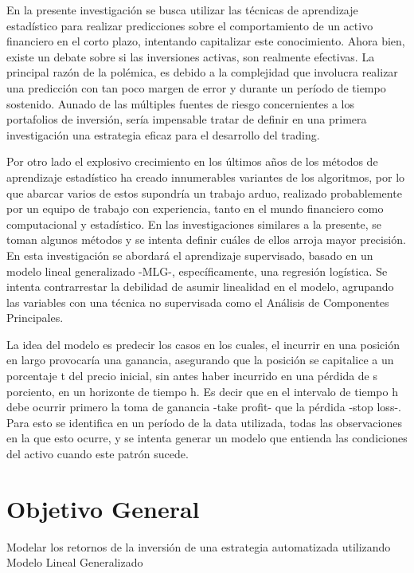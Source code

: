 \documentclass[a4paper,12pt]{Latex/Classes/PhDthesisPSnPDF}
\begin{document}
En la presente investigación se busca utilizar las técnicas de aprendizaje estadístico para realizar predicciones sobre el comportamiento de un activo financiero en el corto  plazo, intentando capitalizar este conocimiento. Ahora bien, existe un debate sobre si las inversiones activas, son realmente efectivas. La principal razón de la polémica, es debido a la complejidad que involucra realizar una predicción con tan poco margen de error y durante un período de tiempo sostenido. Aunado de las múltiples fuentes de riesgo concernientes a los portafolios de inversión, sería impensable tratar de definir en una primera investigación una estrategia eficaz para el desarrollo del trading.

Por otro lado el explosivo crecimiento en los últimos años de los métodos de aprendizaje estadístico ha creado innumerables variantes de los algoritmos, por lo que abarcar varios de estos supondría un trabajo arduo, realizado probablemente por un equipo de trabajo con experiencia, tanto en el mundo financiero como computacional y estadístico. En las investigaciones similares a la presente, se toman algunos métodos y se intenta definir cuáles de ellos arroja mayor precisión. En esta investigación se abordará el aprendizaje supervisado, basado en un modelo lineal generalizado -MLG-, específicamente, una regresión logística. Se intenta contrarrestar la debilidad de asumir linealidad en el modelo, agrupando las variables con una técnica no supervisada como el Análisis de Componentes Principales.

La idea del modelo es predecir los casos en los cuales, el incurrir en una posición en largo provocaría una ganancia, asegurando que la posición se capitalice a un porcentaje t del precio inicial, sin antes haber incurrido en una pérdida de s porciento, en un horizonte de tiempo h. Es decir que en el intervalo de tiempo h debe ocurrir primero la toma de ganancia -take profit- que la pérdida -stop loss-. Para esto se identifica en un período de la data utilizada, todas las observaciones en la que esto ocurre, y se intenta generar un modelo que entienda las condiciones del activo cuando este patrón sucede.

\section{Objetivo General}

Modelar los retornos de la inversión de una estrategia automatizada utilizando Modelo Lineal Generalizado
\end{document}
